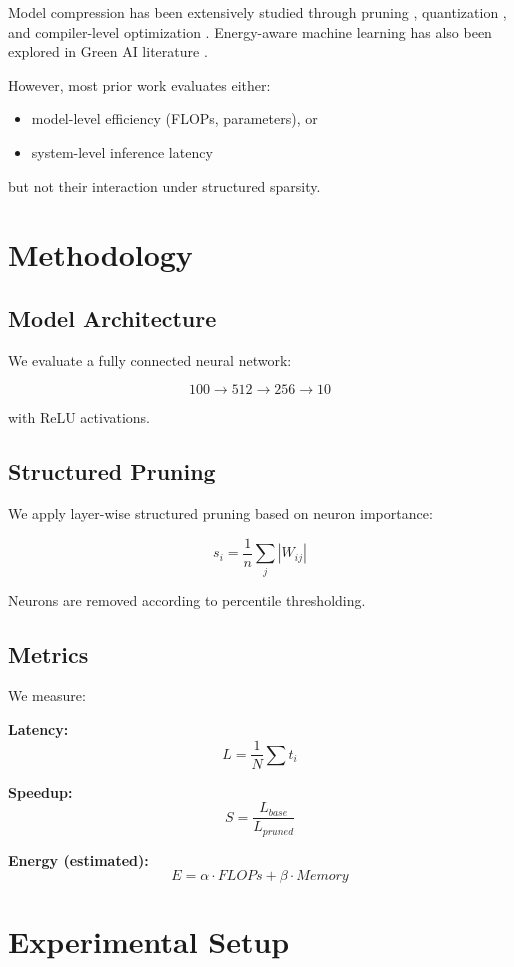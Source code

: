 \documentclass{article}
\begin{document}
Model compression has been extensively studied through pruning \cite{han2015deep}, quantization \cite{jacob2018quantization}, and compiler-level optimization \cite{chen2018tvm}. Energy-aware machine learning has also been explored in Green AI literature \cite{schwartz2019green}.

However, most prior work evaluates either:
\begin{itemize}
    \item model-level efficiency (FLOPs, parameters), or
    \item system-level inference latency
\end{itemize}

but not their interaction under structured sparsity.

\section{Methodology}

\subsection{Model Architecture}

We evaluate a fully connected neural network:

\[
100 \rightarrow 512 \rightarrow 256 \rightarrow 10
\]

with ReLU activations.

\subsection{Structured Pruning}

We apply layer-wise structured pruning based on neuron importance:

\[
s_i = \frac{1}{n} \sum_j |W_{ij}|
\]

Neurons are removed according to percentile thresholding.

\subsection{Metrics}

We measure:

\textbf{Latency:}
\[
L = \frac{1}{N} \sum t_i
\]

\textbf{Speedup:}
\[
S = \frac{L_{base}}{L_{pruned}}
\]

\textbf{Energy (estimated):}
\[
E = \alpha \cdot FLOPs + \beta \cdot Memory
\]

\section{Experimental Setup}
\end{document}

